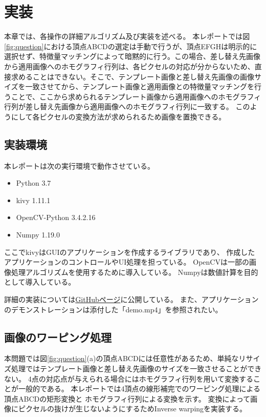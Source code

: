 \section{実装}\label{sec:impl}
本章では、各操作の詳細アルゴリズム及び実装を述べる。
本レポートでは図\ref{fig:question}における頂点ABCDの選定は手動で行うが、頂点EFGHは明示的に選択せず、特徴量マッチングによって暗黙的に行う。この場合、差し替え先画像から適用画像へのホモグラフィ行列は、各ピクセルの対応が分からないため、直接求めることはできない。そこで、テンプレート画像と差し替え先画像の画像サイズを一致させてから、テンプレート画像と適用画像との特徴量マッチングを行うことで、ここから求められるテンプレート画像から適用画像へのホモグラフィ行列が差し替え先画像から適用画像へのホモグラフィ行列に一致する。
このようにして各ピクセルの変換方法が求められるため画像を置換できる。

\subsection{実装環境}
本レポートは次の実行環境で動作させている。
\begin{itemize}
    \item Python 3.7
    \item kivy 1.11.1
    \item OpenCV-Python 3.4.2.16
    \item Numpy 1.19.0
\end{itemize}

ここでkivyはGUIのアプリケーションを作成するライブラリであり、
作成したアプリケーションのコントロールやUI処理を担っている。
OpenCVは一部の画像処理アルゴリズムを使用するために導入している。
Numpyは数値計算を目的として導入している。

詳細の実装については\href{https://github.com/SakumaTakuya/cv_finalreport}{GitHubページ}に公開している。
また、アプリケーションのデモンストレーションは添付した「demo.mp4」を参照されたい。

\subsection{画像のワーピング処理}
本問題では図\ref{fig:question}(a)の頂点ABCDには任意性があるため、単純なリサイズ処理ではテンプレート画像と差し替え先画像のサイズを一致させることができない。
4点の対応点が与えられる場合にはホモグラフィ行列を用いて変換することが一般的である。
本レポートでは4頂点の線形補完でのワーピング処理による頂点ABCDの矩形変換と
ホモグラフィ行列による変換を示す。
変換によって画像にピクセルの抜けが生じないようにするためInverse warpingを実装する。

